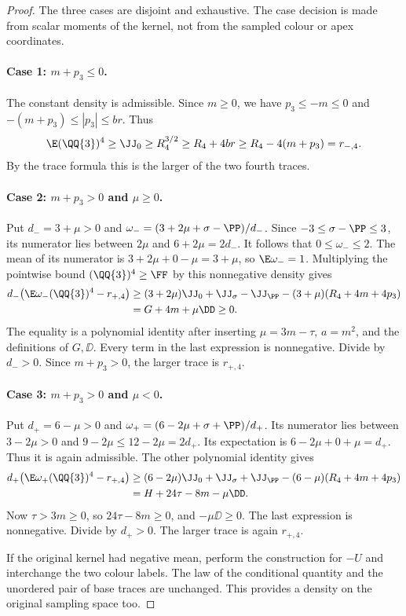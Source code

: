 \begin{proof}
The three cases are disjoint and exhaustive.  The case decision is made from scalar
moments of the kernel, not from the sampled colour or apex coordinates.

\paragraph{Case 1: $m+p_3\le0$.}
The constant density is admissible.  Since $m\ge0$, we have $p_3\le-m\le0$ and
$-(m+p_3)\le|p_3|\le br$.  Thus
\[
 \E(\QQ{3})^4\ge\JJ_0\ge R_4^{3/2}\ge R_4+4br
 \ge R_4-4(m+p_3)=r_{-,4}.
\]
By the trace formula this is the larger of the two fourth traces.

\paragraph{Case 2: $m+p_3>0$ and $\mu\ge0$.}
Put $d_-=3+\mu>0$ and $\omega_-=(3+2\mu+\sigma-\PP)/d_-$.
Since $-3\le\sigma-\PP\le3$, its numerator lies between $2\mu$ and $6+2\mu=2d_-$.
It follows that $0\le\omega_-\le2$.  The mean of its numerator is
$3+2\mu+0-\mu=3+\mu$, so $\E\omega_-=1$.
Multiplying the pointwise bound $(\QQ{3})^4\ge\FF$ by this nonnegative density gives
\begin{align*}
 d_-\bigl(\E\omega_-(\QQ{3})^4-r_{+,4}\bigr)
 &\ge(3+2\mu)\JJ_0+\JJ_\sigma-\JJ_{\PP}
                 -(3+\mu)(R_4+4m+4p_3)\\
 &=G+4m+\mu\DD\ge0.
\end{align*}
The equality is a polynomial identity after inserting
$\mu=3m-\tau$, $a=m^2$, and the definitions of $G,\DD$.
Every term in the last expression is nonnegative.  Divide by $d_->0$.
Since $m+p_3>0$, the larger trace is $r_{+,4}$.

\paragraph{Case 3: $m+p_3>0$ and $\mu<0$.}
Put $d_+=6-\mu>0$ and $\omega_+=(6-2\mu+\sigma+\PP)/d_+$.
Its numerator lies between $3-2\mu>0$ and $9-2\mu\le12-2\mu=2d_+$.
Its expectation is $6-2\mu+0+\mu=d_+$.  Thus it is again admissible.
The other polynomial identity gives
\begin{align*}
 d_+\bigl(\E\omega_+(\QQ{3})^4-r_{+,4}\bigr)
 &\ge(6-2\mu)\JJ_0+\JJ_\sigma+\JJ_{\PP}
                 -(6-\mu)(R_4+4m+4p_3)\\
 &=H+24\tau-8m-\mu\DD.
\end{align*}
Now $\tau>3m\ge0$, so $24\tau-8m\ge0$, and $-\mu\DD\ge0$.
The last expression is nonnegative.  Divide by $d_+>0$.
The larger trace is again $r_{+,4}$.

If the original kernel had negative mean, perform the construction for $-U$ and interchange
the two colour labels.  The law of the conditional quantity and the unordered pair of
base traces are unchanged.  This provides a density on the original sampling space too.
\end{proof}

